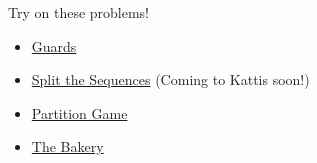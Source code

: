 \documentclass{beamer}
\begin{document}
\begin{frame}{Try on these problems!}
    \begin{itemize}
        \item \href{https://codeforces.com/gym/103536/problem/A}{Guards}
        \item \href{https://dmoj.ca/problem/apio14p2}{Split the Sequences} (Coming to Kattis soon!)
        \item \href{https://codeforces.com/contest/1527/problem/E}{Partition Game}
        \item \href{https://codeforces.com/problemset/problem/834/D}{The Bakery}
    \end{itemize}
\end{frame}
\end{document}
